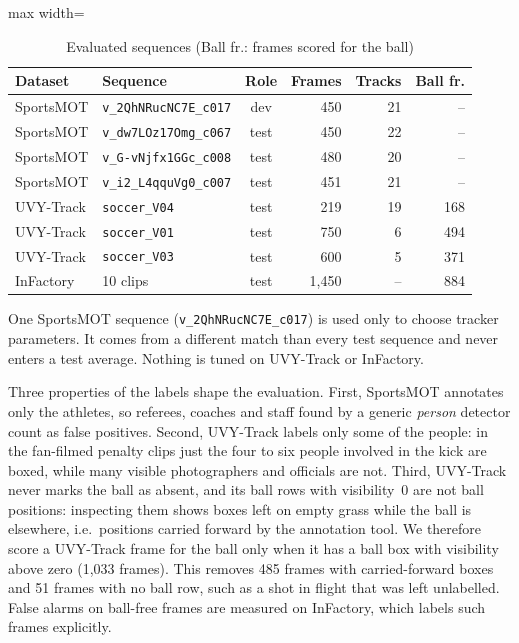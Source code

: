 \documentclass[11pt,a4paper]{article}
\begin{document}
\begin{table}[!t]
\caption{Evaluated sequences (Ball fr.: frames scored for the ball)}
\label{tab:sequences}
\centering
\footnotesize
\begin{adjustbox}{max width=\columnwidth}
\begin{tabular}{@{}llcrrr@{}}
\toprule
Dataset & Sequence & Role & Frames & Tracks & Ball fr. \\
\midrule
SportsMOT & \texttt{v\_2QhNRucNC7E\_c017} & dev & 450 & 21 & -- \\
SportsMOT & \texttt{v\_dw7LOz17Omg\_c067} & test & 450 & 22 & -- \\
SportsMOT & \texttt{v\_G-vNjfx1GGc\_c008} & test & 480 & 20 & -- \\
SportsMOT & \texttt{v\_i2\_L4qquVg0\_c007} & test & 451 & 21 & -- \\
UVY-Track & \texttt{soccer\_V04} & test & 219 & 19 & 168 \\
UVY-Track & \texttt{soccer\_V01} & test & 750 & 6 & 494 \\
UVY-Track & \texttt{soccer\_V03} & test & 600 & 5 & 371 \\
InFactory & 10 clips & test & 1{,}450 & -- & 884 \\
\bottomrule
\end{tabular}
\end{adjustbox}
\end{table}

One SportsMOT sequence (\texttt{v\_2QhNRucNC7E\_c017}) is used only to choose
tracker parameters. It comes from a different match than every test sequence and
never enters a test average. Nothing is tuned on UVY-Track or InFactory.

Three properties of the labels shape the evaluation. First, SportsMOT annotates
only the athletes, so referees, coaches and staff found by a generic
\emph{person} detector count as false positives. Second, UVY-Track labels only
some of the people: in the fan-filmed penalty clips just the four to six people
involved in the kick are boxed, while many visible photographers and officials
are not. Third, UVY-Track never marks the ball as absent, and its ball rows with
visibility~0 are not ball positions: inspecting them shows boxes left on empty
grass while the ball is elsewhere, i.e.\ positions carried forward by the
annotation tool. We therefore score a UVY-Track frame for the ball only when it
has a ball box with visibility above zero (1{,}033 frames). This removes
485 frames with carried-forward boxes and 51 frames with no
ball row, such as a shot in flight that was left unlabelled. False alarms on
ball-free frames are measured on InFactory, which labels such frames explicitly.
\end{document}
